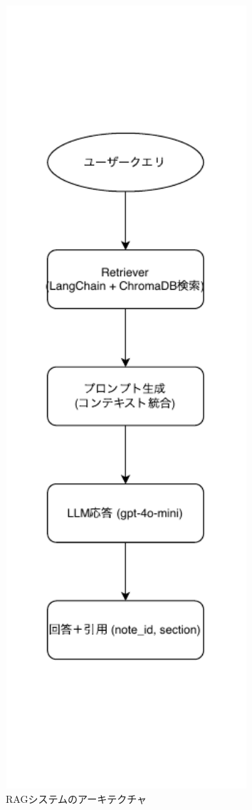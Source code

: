 \documentclass[12pt,a4paper]{jsarticle}
\begin{document}
\begin{figure}[H]
    \centering
    \includegraphics[width=0.8\textwidth]{RAG_Flowchart2.pdf}
    \caption{RAGシステムのアーキテクチャ}
    \label{fig:rag_system_architecture2}
\end{figure}
\end{document}
